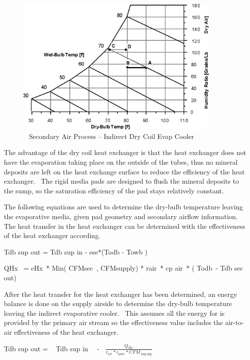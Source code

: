 \begin{figure}[hbtp] %
\centering
\includegraphics[width=0.9\textwidth, height=0.9\textheight, keepaspectratio=true]{media/image4795.png}
\caption{  Secondary Air Process -- Indirect Dry Coil Evap Cooler \protect \label{fig:secondary-air-process-indirect-dry-coil-evap}}
\end{figure}

The advantage of the dry coil heat exchanger is that the heat exchanger does not have the evaporation taking place on the outside of the tubes, thus no mineral deposits are left on the heat exchange surface to reduce the efficiency of the heat exchanger.~ The rigid media pads are designed to flush the mineral deposits to the sump, so the saturation efficiency of the pad stays relatively constant.

The following equations are used to determine the dry-bulb temperature leaving the evaporative media, given pad geometry and secondary airflow information.~ The heat transfer in the heat exchanger can be determined with the effectiveness of the heat exchanger according.

Tdb sup out = Tdb sup in - ese*(Todb - Towb )

QHx~ = eHx~* Min( CFMsec~, CFMsupply) * rair~* cp air~* ( Todb~- Tdb sec out)

After the heat transfer for the heat exchanger has been determined, an energy balance is done on the supply airside to determine the dry-bulb temperature leaving the indirect evaporative cooler. ~This assumes all the energy for is provided by the primary air stream so the effectiveness value includes the air-to-air effectiveness of the heat exchanger.

Tdb sup out = ~ Tdb sup in~~ -~ \(\frac{{{Q_{Hx}}}}{{{r_{air}}*{c_{pair}}*CF{M_{\sup ply}}}}\)

